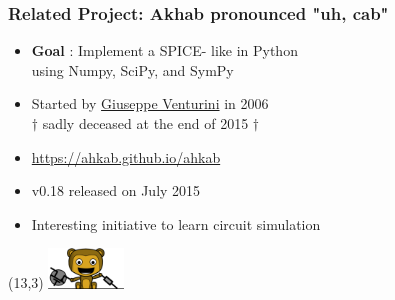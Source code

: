 
\begin{frame}
  \frametitle{Related Project: Akhab \hspace{1em} \small{pronounced "uh, cab"}}
  \begin{itemize}
  \item \textbf{Goal} : Implement a SPICE- like in Python \\
    using Numpy, SciPy, and SymPy
  \item Started by \href{http://ggventurini.io}{Giuseppe Venturini} in 2006 \\
    {\tiny $\dag$ sadly deceased at the end of 2015 $\dag$}
  \item \url{https://ahkab.github.io/ahkab} %
  \item v0.18 released on July 2015
  \item \alert{Interesting initiative to learn circuit simulation}
  \end{itemize}
  \begin{textblock}{4}(13,3)
    \includegraphics[width=2cm]{images/akhab.png}
  \end{textblock}
\end{frame}

